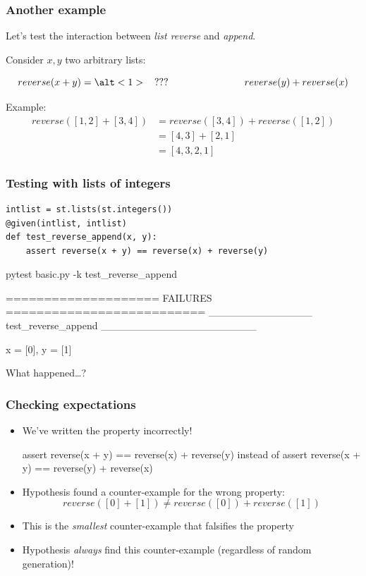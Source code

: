 \documentclass{beamer}
\begin{document}
\begin{frame}
  \frametitle{Another example}

  Let's test the interaction between \emph{list reverse}
  and \emph{append}.
  
  Consider $x, y$ two arbitrary lists:

  \[  reverse(x + y) = \alt<1>{\hspace{2ex}???\hspace{18ex}}{reverse(y) + reverse(x)} \]
  \pause

  Example:
  \[\begin{array}{ll}
      reverse([1,2] + [3,4]) &= reverse([3,4]) + reverse([1,2]) \\
                             &= [4,3] + [2,1]\\
                             &= [4,3,2,1]
  \end{array}\] 
\end{frame}

\begin{frame}[fragile]
  \frametitle{Testing with lists of integers}

\begin{verbatim}
intlist = st.lists(st.integers())
@given(intlist, intlist)
def test_reverse_append(x, y):
    assert reverse(x + y) == reverse(x) + reverse(y)
\end{verbatim}
\medskip
\pause
  
\begin{semiverbatim}
pytest basic.py -k test_reverse_append

==================== FAILURES ==========================
\alert{______________ test_reverse_append _____________________}

x = [0], y = [1]
\end{semiverbatim}
What happened\ldots ?  
\end{frame}

\begin{frame}[fragile]
  \frametitle{Checking expectations}


\begin{itemize}
\item We've written the property incorrectly!
\begin{semiverbatim}
  assert reverse(x + y) == reverse(\alert{x}) + reverse(\alert{y})
      \textsf{instead of}
  assert reverse(x + y) == reverse(y) + reverse(x)  
\end{semiverbatim}
\item Hypothesis found a counter-example for the wrong property:
   \[ reverse([0]+[1]) \neq reverse([0]) + reverse([1]) \]
\item This is the \emph{smallest} counter-example
  that falsifies the property
\item Hypothesis \emph{always} find this counter-example
  (regardless of random generation)!
\end{itemize}
\end{frame}
\end{document}
